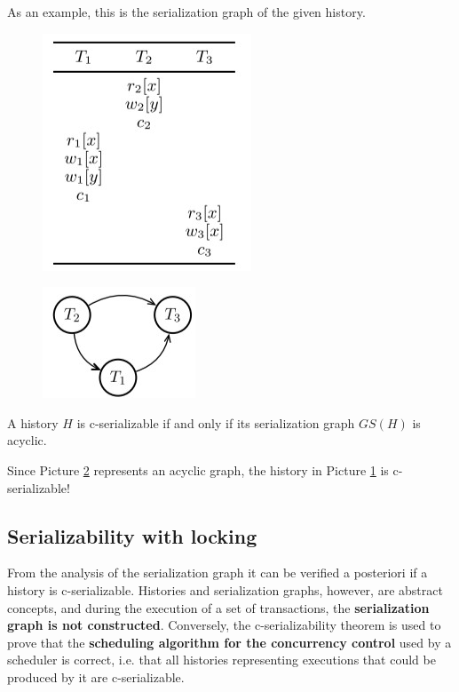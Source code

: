 As an example, this is the serialization graph of the given history.

\begin{figure}[h!]
		\centering
		\includegraphics[scale = 1.5]{img/conc4.jpg}
		\label{conc4}
\end{figure}

\begin{figure}[h!]
		\centering
		\includegraphics[scale = 1.5]{img/conc5.jpg}
		\label{conc5}
\end{figure}

\begin{tcolorbox}[title = C-Serializability theorem]
    A history $H$ is c-serializable if and only if its serialization graph $GS(H)$ is acyclic.
\end{tcolorbox}

Since Picture \ref{conc5} represents an acyclic graph, the history in Picture \ref{conc4} is c-serializable!

\subsection{Serializability with locking}

From the analysis of the serialization graph it can be verified a posteriori if a history is c-serializable. Histories and serialization graphs, however, are abstract concepts, and during the execution of a set of transactions, the \textbf{serialization graph is not constructed}. Conversely, the c-serializability theorem is used to prove that the \textbf{scheduling algorithm for the concurrency control} used by a scheduler is correct, i.e. that all histories representing executions that could be produced by it are c-serializable.

